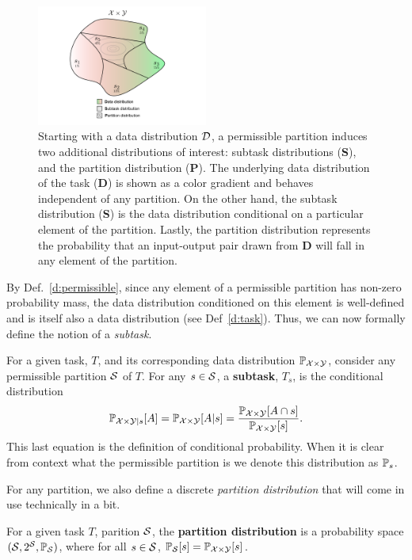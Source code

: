 \begin{figure}[h!]
\centering
\includegraphics[width=0.5\textwidth]{figs/permissible-partition.pdf}
\caption{Starting with a data distribution $\cD$, a permissible partition
induces two additional distributions of interest: subtask distributions
(\textbf{S}), and the partition distribution (\textbf{P}). 
The underlying data
distribution of the task (\textbf{D}) is shown as a color gradient
and behaves independent of any partition. 
On the other hand, the subtask
distribution (\textbf{S}) is the data distribution conditional 
on a particular
element of the partition. Lastly, the partition distribution 
represents the probability that an input-output pair drawn from
\textbf{D} will fall in any element of the partition.}
\label{f:permissible-partition-induced-distributions}
\end{figure}
By Def.~\ref{d:permissible}, since any element of a permissible partition
has non-zero probability mass, the data distribution conditioned on this
element is well-defined and is itself also a data distribution 
(see Def~\ref{d:task}). Thus, we can now formally define the notion
of a \textit{subtask}.
\begin{defn}[Subtask]
For a given task, $T$, and its corresponding data distribution 
$\P_{\cX\times\cY}$, consider any permissible partition $\cS$ of $T$.
For any $s \in \cS$, a \textbf{subtask}, $T_s$, is the conditional
distribution
\[
\P_{\cX\times \cY | s}[A] = \P_{\cX\times \cY}[A | s]
= \frac{\P_{\cX\times\cY}[A \cap s]}{\P_{\cX \times \cY}[s]}.
\]
This last equation is the definition of conditional probability.
When it is clear from context what the permissible partition is 
we denote this distribution as $\P_s$.
\end{defn}
For any partition, we also define a discrete \textit{partition distribution}
that will come in use technically in a bit. 
\begin{defn}
For a given task $T$, parition $\cS$, the \textbf{partition distribution}
is a probability space $(\cS, 2^{\cS}, \P_\cS)$, where for all $s \in \cS$,
$\P_\cS[s] = \P_{\cX\times\cY}[s]$.
\end{defn}

